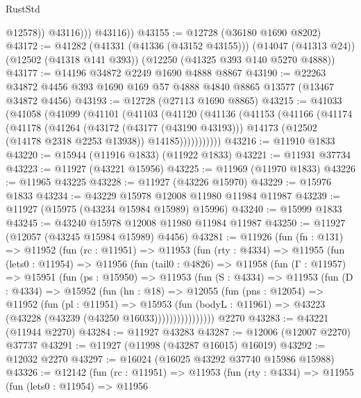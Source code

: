 \begin{lexlean}{RustStd}
\begin{coremodule}
                  @12578))
              @43116)))
        @43116))
@43155 := @12728 (@36180 @1690 @8202)
@43172 := @41282
    (@41331 (@41336 (@43152 @43155)))
    (@14047 (@41313 @24))
    (@12502 (@41318 @141 @393))
    (@12250 (@41325 @393 @140 @5270 @4888))
@43177 := @14196 @34872 @2249 @1690 @4888 @8867
@43190 := @22263 @34872 @4456 @393 @1690 @169 @57 @4888 @4840 @8865 @13577 (@13467 @34872 @4456)
@43193 := @12728 (@27113 @1690 @8865)
@43215 := @41033
    (@41058
      (@41099
        (@41101
          (@41103
            (@41120
              (@41136
                (@41153
                  (@41166
                    (@41174
                      (@41178
                        (@41264
                          (@43172 (@43177 (@43190 @43193)))
                          @14173
                          (@12502 (@14178 @2318 @2253 @13938))
                          @14185)))))))))))
@43216 := @11910 @1833
@43220 := @15944 (@11916 @1833) (@11922 @1833)
@43221 := @11931 @37734
@43223 := @11927 (@43221 @15956)
@43225 := @11969 (@11970 @1833)
@43226 := @11965 @43225
@43228 := @11927 (@43226 @15970)
@43229 := @15976 @1833
@43234 := @43229 @15978 @12008 @11980 @11984 @11987
@43239 := @11927 (@15975 (@43234 @15984 @15989) @15996)
@43240 := @15999 @1833
@43245 := @43240 @15978 @12008 @11980 @11984 @11987
@43250 := @11927 (@12057 (@43245 @15984 @15989) @4456)
@43281 := @11926
    (fun (fn : @131) =>
    @11952
      (fun (rc : @11951) =>
      @11953
        (fun (rty : @4334) =>
        @11955
          (fun (lets0 : @11954) =>
          @11956
            (fun (tail0 : @4826) =>
            @11958
              (fun (Γ : @11957) =>
              @15951
                (fun (ps : @15950) =>
                @11953
                  (fun (S : @4334) =>
                  @11953
                    (fun (D : @4334) =>
                    @15952
                      (fun (hn : @18) =>
                      @12055
                        (fun (pns : @12054) =>
                        @11952
                          (fun (pl : @11951) =>
                          @15953
                            (fun (bodyL : @11961) =>
                            @43223 (@43228 (@43239 (@43250 @16033))))))))))))))))
    @2270
@43283 := @43221 (@11944 @2270)
@43284 := @11927 @43283
@43287 := @12006 (@12007 @2270) @37737
@43291 := @11927 (@11998 (@43287 @16015) @16019)
@43292 := @12032 @2270
@43297 := @16024 (@16025 @43292 @37740 @15986 @15988)
@43326 := @12142
    (fun (rc : @11951) =>
    @11953
      (fun (rty : @4334) =>
      @11955
        (fun (lets0 : @11954) =>
        @11956

\end{coremodule}
\end{lexlean}

